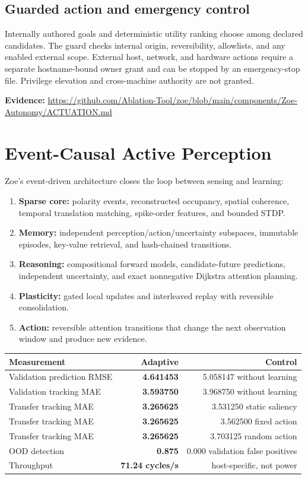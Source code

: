 \documentclass[11pt]{article}
\newcommand{\evidence}[1]{\par\smallskip\small\color{ZoeGray}\textbf{Evidence:} #1\normalsize\par\smallskip}
\begin{document}
\subsection{Guarded action and emergency control}

Internally authored goals and deterministic utility ranking choose among declared candidates. The guard checks internal origin, reversibility, allowlists, and any enabled external scope. External host, network, and hardware actions require a separate hostname-bound owner grant and can be stopped by an emergency-stop file. Privilege elevation and cross-machine authority are not granted.

\evidence{\url{https://github.com/Ablation-Tool/zoe/blob/main/components/Zoe-Autonomy/ACTUATION.md}}

\clearpage
\section{Event-Causal Active Perception}

Zoe's event-driven architecture closes the loop between sensing and learning:
\begin{enumerate}
  \item \textbf{Sparse core:} polarity events, reconstructed occupancy, spatial coherence, temporal translation matching, spike-order features, and bounded STDP.
  \item \textbf{Memory:} independent perception/action/uncertainty subspaces, immutable episodes, key-value retrieval, and hash-chained transitions.
  \item \textbf{Reasoning:} compositional forward models, candidate-future predictions, independent uncertainty, and exact nonnegative Dijkstra attention planning.
  \item \textbf{Plasticity:} gated local updates and interleaved replay with reversible consolidation.
  \item \textbf{Action:} reversible attention transitions that change the next observation window and produce new evidence.
\end{enumerate}

\begin{center}
\begin{tabular}{lrr}
\toprule
\textbf{Measurement} & \textbf{Adaptive} & \textbf{Control}\\
\midrule
Validation prediction RMSE & \textbf{4.641453} & 5.058147 without learning\\
Validation tracking MAE & \textbf{3.593750} & 3.968750 without learning\\
Transfer tracking MAE & \textbf{3.265625} & 3.531250 static saliency\\
Transfer tracking MAE & \textbf{3.265625} & 3.562500 fixed action\\
Transfer tracking MAE & \textbf{3.265625} & 3.703125 random action\\
OOD detection & \textbf{0.875} & 0.000 validation false positives\\
Throughput & \textbf{71.24 cycles/s} & host-specific, not power\\
\bottomrule
\end{tabular}
\end{center}
\end{document}
